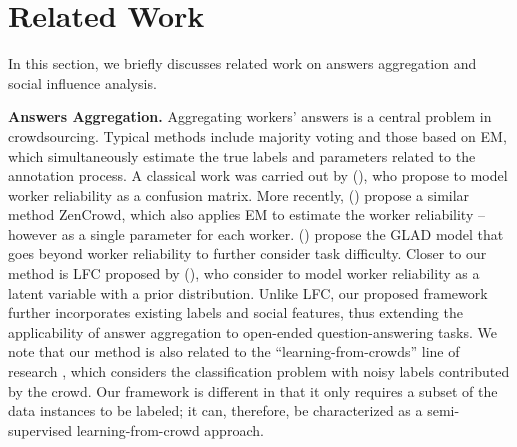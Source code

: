 \section{Related Work}

In this section, we briefly discusses related work on answers aggregation and social influence analysis.

\smallskip
\noindent\textbf{Answers Aggregation.} Aggregating workers' answers is a central problem in crowdsourcing. Typical methods include majority voting \cite{sheng2008get} and those based on EM, which simultaneously estimate the true labels and parameters related to the annotation process. A classical work was carried out by \citeauthor{dawid1979maximum} (\citeyear{dawid1979maximum}), who propose to model worker reliability as a confusion matrix. More recently, \citeauthor{demartini2012zencrowd} (\citeyear{demartini2012zencrowd}) propose a similar method ZenCrowd, which also applies EM to estimate the worker reliability -- however as a single parameter for each worker. \citeauthor{whitehill2009whose} (\citeyear{whitehill2009whose}) propose the GLAD model that goes beyond worker reliability to further consider task difficulty. Closer to our method is LFC proposed by \citeauthor{raykar2010learning} (\citeyear{raykar2010learning}), who consider to model worker reliability as a latent variable with a prior distribution. Unlike LFC, our proposed framework further incorporates existing labels and social features, thus extending the applicability of answer aggregation to open-ended question-answering tasks. We note that our method is also related to the ``learning-from-crowds'' line of research \cite{raykar2010learning,tian2012learning,yang2018leveraging}, which considers the classification problem with noisy labels contributed by the crowd. Our framework is different in that it only requires a subset of the data instances to be labeled; it can, therefore, be characterized as a semi-supervised learning-from-crowd approach. 


